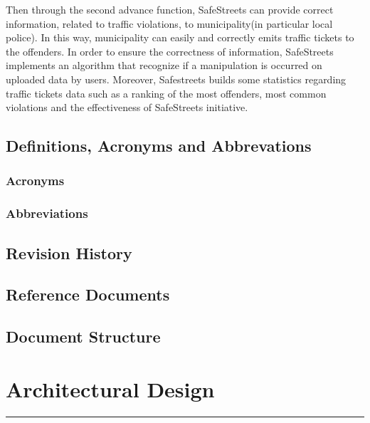 \documentclass[12pt]{article}
\begin{document}
Then through the second advance function, SafeStreets can provide correct information, related to traffic violations, to municipality(in particular local police). In this way, municipality can easily and correctly emits traffic tickets to the offenders. In order to ensure the correctness of information, SafeStreets implements an algorithm that recognize if a manipulation is occurred on uploaded data by users. Moreover, Safestreets builds some statistics regarding traffic tickets data such as a ranking of the most offenders, most common violations and the effectiveness of SafeStreets initiative.
\vspace{1cm}

\subsection{Definitions, Acronyms and Abbrevations}
\vspace{5mm}
\subsubsection{Acronyms}
\subsubsection{Abbreviations}
\vspace{5mm}
\subsection{Revision History}
\subsection{Reference Documents}
\subsection{Document Structure}

\newpage
\section{Architectural Design}
\hrule
\vspace{1cm}
\end{document}
